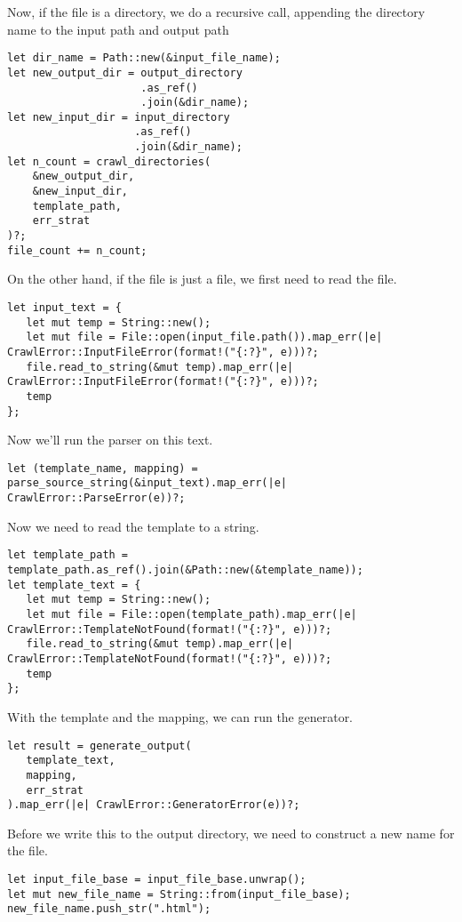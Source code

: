 \documentclass[11pt]{article}
\begin{document}
Now, if the file is a directory, we do a recursive call, appending the directory name to the input path and output path 
\begin{verbatim}
let dir_name = Path::new(&input_file_name);
let new_output_dir = output_directory
                     .as_ref()
                     .join(&dir_name);
let new_input_dir = input_directory
                    .as_ref()
                    .join(&dir_name);
let n_count = crawl_directories(
    &new_output_dir, 
    &new_input_dir, 
    template_path, 
    err_strat
)?;
file_count += n_count;
\end{verbatim}


On the other hand, if the file is just a file, we first need to read the file.
\begin{verbatim}
let input_text = {
   let mut temp = String::new();
   let mut file = File::open(input_file.path()).map_err(|e| CrawlError::InputFileError(format!("{:?}", e)))?;
   file.read_to_string(&mut temp).map_err(|e| CrawlError::InputFileError(format!("{:?}", e)))?;
   temp
};
\end{verbatim}

Now we'll run the parser on this text.
\begin{verbatim}
let (template_name, mapping) = parse_source_string(&input_text).map_err(|e| CrawlError::ParseError(e))?;
\end{verbatim}

Now we need to read the template to a string.
\begin{verbatim}
let template_path = template_path.as_ref().join(&Path::new(&template_name));
let template_text = {
   let mut temp = String::new();
   let mut file = File::open(template_path).map_err(|e| CrawlError::TemplateNotFound(format!("{:?}", e)))?;
   file.read_to_string(&mut temp).map_err(|e| CrawlError::TemplateNotFound(format!("{:?}", e)))?;
   temp
};
\end{verbatim}

With the template and the mapping, we can run the generator.
\begin{verbatim}
let result = generate_output(
   template_text, 
   mapping, 
   err_strat
).map_err(|e| CrawlError::GeneratorError(e))?;
\end{verbatim}

Before we write this to the output directory, we need to construct a new name for the file.
\begin{verbatim}
let input_file_base = input_file_base.unwrap();
let mut new_file_name = String::from(input_file_base);
new_file_name.push_str(".html");
\end{verbatim}
\end{document}
